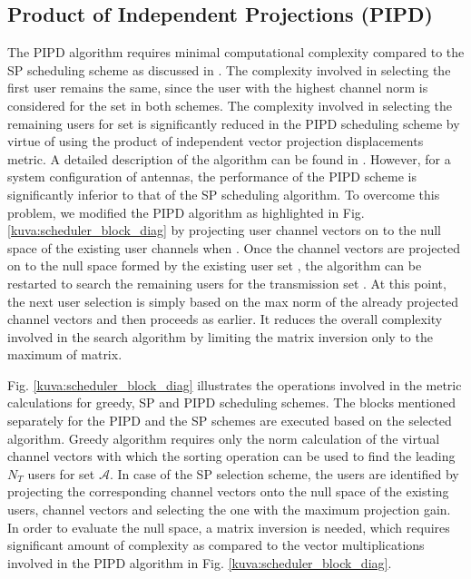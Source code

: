 \documentclass[conference,letterpaper,10pt]{./../../IEEE/IEEEtran}
\begin{document}
\subsection{Product of Independent Projections (PIPD)}
The PIPD algorithm requires minimal computational complexity compared to the SP scheduling scheme as discussed in \cite{venkatraman2014low}. The complexity involved in selecting the first user remains the same, since the user with the highest channel norm is considered for the set  in both schemes. The complexity involved in selecting the remaining users for set  is significantly reduced in the PIPD scheduling scheme by virtue of using the product of independent vector projection displacements metric. A detailed description of the algorithm can be found in \cite{venkatraman2014low}. However, for a system configuration of  antennas, the performance of the PIPD scheme is significantly inferior to that of the SP scheduling algorithm. To overcome this problem, we modified the PIPD algorithm as highlighted in Fig. \ref{kuva:scheduler_block_diag} by projecting user channel vectors on to the null space of the existing user channels when . Once the channel vectors are projected on to the null space formed by the existing user set , the algorithm can be restarted to search the remaining  users for the transmission set . At this point, the next user selection is simply based on the max norm of the already projected channel vectors and then proceeds as earlier. It reduces the overall complexity involved in the search algorithm by limiting the matrix inversion only to the maximum of  matrix.

Fig. \ref{kuva:scheduler_block_diag} illustrates the operations involved in the metric calculations for greedy, SP and PIPD scheduling schemes. The blocks mentioned separately for the PIPD and the SP schemes are executed based on the selected algorithm. Greedy algorithm requires only the norm calculation of the virtual channel vectors with which the sorting operation can be used to find the leading $N_T$ users for set $\mathcal{A}$. In case of the SP selection scheme, the users are identified by projecting the corresponding channel vectors onto the null space of the existing users, channel vectors and selecting the one with the maximum projection gain. In order to evaluate the null space, a matrix inversion is needed, which requires significant amount of complexity as compared to the vector multiplications involved in the PIPD algorithm in Fig. \ref{kuva:scheduler_block_diag}.
\end{document}
